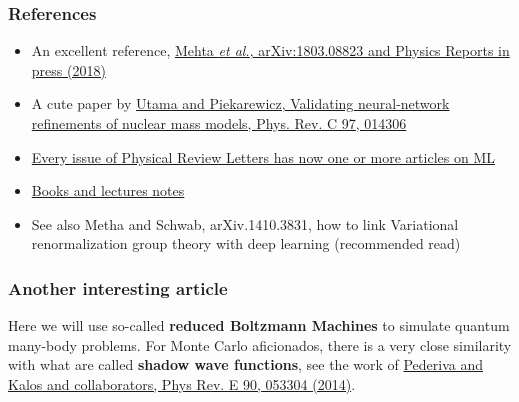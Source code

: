 \documentclass{beamer}
\begin{document}
\begin{frame}
\frametitle{References}

\begin{block}{}
\begin{itemize}
\item An excellent reference, \href{{https://arxiv.org/abs/1803.08823}}{Mehta \emph{et al.}, arXiv:1803.08823 and Physics Reports in press (2018)}

\item A cute paper by \href{{https://journals.aps.org/prc/abstract/10.1103/PhysRevC.97.014306}}{Utama and Piekarewicz, Validating neural-network refinements of nuclear mass models, Phys. Rev. C 97, 014306}

\item \href{{https://journals.aps.org/prl/abstract/10.1103/PhysRevLett.120.156001}}{Every issue of Physical Review Letters has now one or more articles on ML}

\item \href{{https://github.com/CompPhysics/MachineLearning}}{Books and lectures notes}

\item See also Metha and Schwab, arXiv.1410.3831, how to link Variational renormalization group theory with deep learning (recommended read)
\end{itemize}

\noindent
\end{block}
\end{frame}

\begin{frame}
\frametitle{Another interesting article}

Here we will use so-called \textbf{reduced Boltzmann Machines} to simulate quantum many-body problems. For Monte Carlo aficionados, there is a very close similarity with what are called \textbf{shadow wave functions}, see the work of \href{{https://journals.aps.org/pre/abstract/10.1103/PhysRevE.90.053304}}{Pederiva and Kalos and collaborators, Phys Rev. E 90, 053304 (2014)}.
\end{frame}
\end{document}
